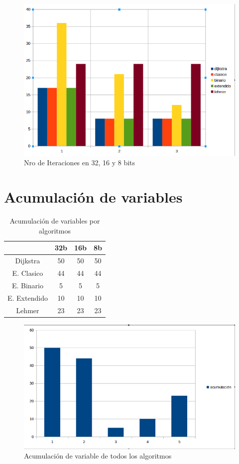 \begin{figure}[h]
 \centering
 \includegraphics[scale=0.4]{./iteracion.png}
 \caption{Nro de Iteraciones en 32, 16 y 8 bits}
 \label{fig:2}
\end{figure}


\section{Acumulaci\'on de variables}

\begin{table}[H]
\label{tablax}
\begin{center}
\begin{tabular}{|c|c|c|c|}
\hline 
 &32b&16b&8b \\
\hline
Dijkstra& 50 & 50 & 50 \\ \hline
E. Clasico& 44 & 44 & 44 \\ \hline
E. Binario& 5 & 5 & 5 \\ \hline
E. Extendido& 10 & 10 & 10 \\ \hline
Lehmer& 23 & 23 & 23 \\ \hline
\end{tabular}
\end{center}
\caption{Acumulaci\'on de variables por algoritmos}
\end{table}


\begin{figure}[h]
 \centering
 \includegraphics[scale=0.4]{./acmulac.png}
 \caption{Acumulación de variable de todos los algoritmos}
 \label{fig:3}
\end{figure}

